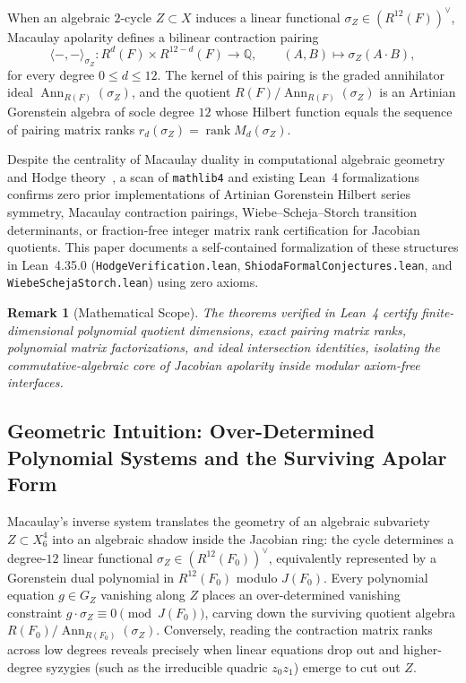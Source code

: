 \documentclass[11pt,a4paper]{article}
\newtheorem{remark}[theorem]{Remark}
\begin{document}
When an algebraic $2$-cycle $Z \subset X$ induces a linear functional $\sigma_Z \in (R^{12}(F))^\vee$, Macaulay apolarity defines a bilinear contraction pairing
\begin{equation}
  \langle -, - \rangle_{\sigma_Z} : R^d(F) \times R^{12-d}(F) \longrightarrow \mathbb{Q}, \qquad (A, B) \longmapsto \sigma_Z(A \cdot B),
\end{equation}
for every degree $0 \le d \le 12$. The kernel of this pairing is the graded annihilator ideal $\operatorname{Ann}_{R(F)}(\sigma_Z)$, and the quotient $R(F) / \operatorname{Ann}_{R(F)}(\sigma_Z)$ is an Artinian Gorenstein algebra of socle degree $12$ whose Hilbert function equals the sequence of pairing matrix ranks $r_d(\sigma_Z) = \operatorname{rank} M_d(\sigma_Z)$.

Despite the centrality of Macaulay duality in computational algebraic geometry and Hodge theory~\cite{Voisin2002}, a scan of \texttt{mathlib4} and existing Lean~4 formalizations confirms zero prior implementations of Artinian Gorenstein Hilbert series symmetry, Macaulay contraction pairings, Wiebe--Scheja--Storch transition determinants, or fraction-free integer matrix rank certification for Jacobian quotients. This paper documents a self-contained formalization of these structures in Lean~4.35.0 (\texttt{HodgeVerification.lean}, \texttt{ShiodaFormalConjectures.lean}, and \texttt{WiebeSchejaStorch.lean}) using zero axioms.

\begin{remark}[Mathematical Scope]
  The theorems verified in Lean~4 certify finite-dimensional polynomial quotient dimensions, exact pairing matrix ranks, polynomial matrix factorizations, and ideal intersection identities, isolating the commutative-algebraic core of Jacobian apolarity inside modular axiom-free interfaces.
\end{remark}

\subsection{Geometric Intuition: Over-Determined Polynomial Systems and the Surviving Apolar Form}

Macaulay's inverse system translates the geometry of an algebraic subvariety $Z \subset X_6^4$ into an algebraic shadow inside the Jacobian ring: the cycle determines a degree-$12$ linear functional $\sigma_Z \in (R^{12}(F_0))^\vee$, equivalently represented by a Gorenstein dual polynomial in $R^{12}(F_0)$ modulo $J(F_0)$. Every polynomial equation $g \in G_Z$ vanishing along $Z$ places an over-determined vanishing constraint $g \cdot \sigma_Z \equiv 0 \pmod{J(F_0)}$, carving down the surviving quotient algebra $R(F_0) / \operatorname{Ann}_{R(F_0)}(\sigma_Z)$. Conversely, reading the contraction matrix ranks across low degrees reveals precisely when linear equations drop out and higher-degree syzygies (such as the irreducible quadric $z_0 z_1$) emerge to cut out $Z$.
\end{document}
